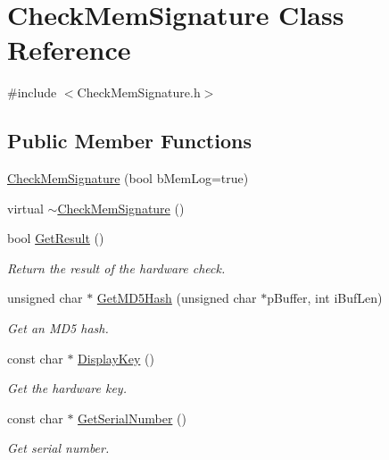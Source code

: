 \hypertarget{class_check_mem_signature}{\section{\-Check\-Mem\-Signature \-Class \-Reference}
\label{class_check_mem_signature}
}


{\ttfamily \#include $<$\-Check\-Mem\-Signature.\-h$>$}

\subsection*{\-Public \-Member \-Functions}
\begin{DoxyCompactItemize}
\item 
\hyperlink{class_check_mem_signature_a3cc20e6a1eb1424cc62d488562aec572}{\-Check\-Mem\-Signature} (bool b\-Mem\-Log=true)
\item 
virtual \hyperlink{class_check_mem_signature_a7c24bca0f4aadb879ce156e732a19aa3}{$\sim$\-Check\-Mem\-Signature} ()
\item 
bool \hyperlink{class_check_mem_signature_a4973b2795d5e8c1e396f9aed771ffeaa}{\-Get\-Result} ()
\begin{DoxyCompactList}\small\item\em \-Return the result of the hardware check. \end{DoxyCompactList}\item 
unsigned char $\ast$ \hyperlink{class_check_mem_signature_ac1493574a1581fdd477a252fdf9266fd}{\-Get\-M\-D5\-Hash} (unsigned char $\ast$p\-Buffer, int i\-Buf\-Len)
\begin{DoxyCompactList}\small\item\em \-Get an \-M\-D5 hash. \end{DoxyCompactList}\item 
const char $\ast$ \hyperlink{class_check_mem_signature_a3686ee9da391a0927c079a4c451c843e}{\-Display\-Key} ()
\begin{DoxyCompactList}\small\item\em \-Get the hardware key. \end{DoxyCompactList}\item 
const char $\ast$ \hyperlink{class_check_mem_signature_af4453571e33116b38b15df61ca190dc3}{\-Get\-Serial\-Number} ()
\begin{DoxyCompactList}\small\item\em \-Get serial number. \end{DoxyCompactList}\end{DoxyCompactItemize}

